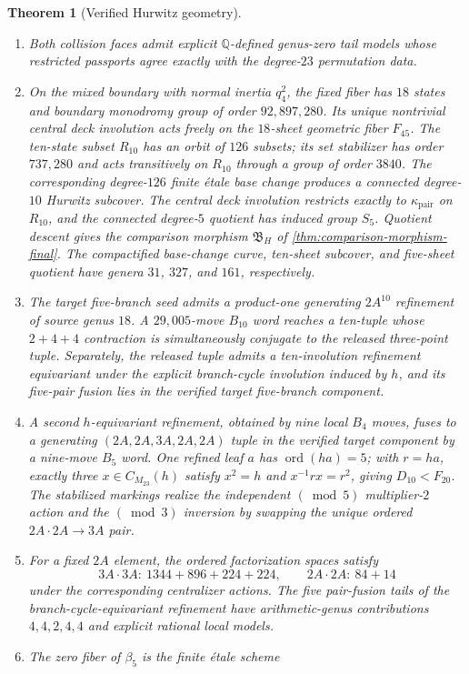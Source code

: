 \documentclass[11pt]{article}
\newtheorem{theorem}{Theorem}[section]
\theoremstyle{remark}
\newcommand{\Q}{\mathbb Q}
\newcommand{\ord}{\operatorname{ord}}
\begin{document}
\begin{theorem}[Verified Hurwitz geometry]
\begin{enumerate}[label=\textnormal{(\roman*)},leftmargin=2.4em]
\item Both collision faces admit explicit $\Q$-defined genus-zero tail models whose restricted passports agree exactly with the degree-$23$ permutation data.
\item On the mixed boundary with normal inertia $q_4^2$, the fixed fiber has $18$ states and boundary monodromy group of order $92{,}897{,}280$.  Its unique nontrivial central deck involution acts freely on the $18$-sheet geometric fiber $F_{45}$.  The ten-state subset $R_{10}$ has an orbit of $126$ subsets; its set stabilizer has order $737{,}280$ and acts transitively on $R_{10}$ through a group of order $3840$.  The corresponding degree-$126$ finite \'etale base change produces a connected degree-$10$ Hurwitz subcover.  The central deck involution restricts exactly to $\kappa_{\mathrm{pair}}$ on $R_{10}$, and the connected degree-$5$ quotient has induced group $S_5$.  Quotient descent gives the comparison morphism $\mathfrak B_H$ of \cref{thm:comparison-morphism-final}.  The compactified base-change curve, ten-sheet subcover, and five-sheet quotient have genera $31$, $327$, and $161$, respectively.
\item The target five-branch seed admits a product-one generating $2A^{10}$ refinement of source genus $18$.  A $29{,}005$-move $B_{10}$ word reaches a ten-tuple whose $2+4+4$ contraction is simultaneously conjugate to the released three-point tuple.  Separately, the released tuple admits a ten-involution refinement equivariant under the explicit branch-cycle involution induced by $h$, and its five-pair fusion lies in the verified target five-branch component.
\item A second $h$-equivariant refinement, obtained by nine local $B_4$ moves, fuses to a generating $(2A,2A,3A,2A,2A)$ tuple in the verified target component by a nine-move $B_5$ word.  One refined leaf $a$ has $\ord(ha)=5$; with $r=ha$, exactly three $x\in C_{M_{23}}(h)$ satisfy $x^2=h$ and $x^{-1}rx=r^2$, giving $D_{10}<F_{20}$.  The stabilized markings realize the independent $(\bmod 5)$ multiplier-$2$ action and the $(\bmod 3)$ inversion by swapping the unique ordered $2A\cdot2A\to3A$ pair.
\item For a fixed $2A$ element, the ordered factorization spaces satisfy
\[
 3A\cdot3A:\ 1344+896+224+224,
 \qquad
 2A\cdot2A:\ 84+14
\]
under the corresponding centralizer actions.  The five pair-fusion tails of the branch-cycle-equivariant refinement have arithmetic-genus contributions $4,4,2,4,4$ and explicit rational local models.
\item The zero fiber of $\beta_5$ is the finite \'etale scheme

\end{enumerate}
\end{theorem}
\end{document}
